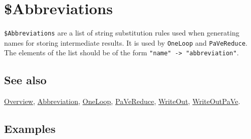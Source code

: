 \documentclass[../FeynCalcManual.tex]{subfiles}
\begin{document}
\hypertarget{dollarabbreviations}{
\section{\$Abbreviations}\label{dollarabbreviations}}

\texttt{\$Abbreviations} are a list of string substitution rules used
when generating names for storing intermediate results. It is used by
\texttt{OneLoop} and \texttt{PaVeReduce}. The elements of the list
should be of the form \texttt{"name" -> "abbreviation"}.

\subsection{See also}

\hyperlink{toc}{Overview}, \hyperlink{abbreviation}{Abbreviation},
\hyperlink{oneloop}{OneLoop}, \hyperlink{pavereduce}{PaVeReduce},
\hyperlink{writeout}{WriteOut}, \hyperlink{writeoutpave}{WriteOutPaVe}.

\subsection{Examples}
\end{document}
